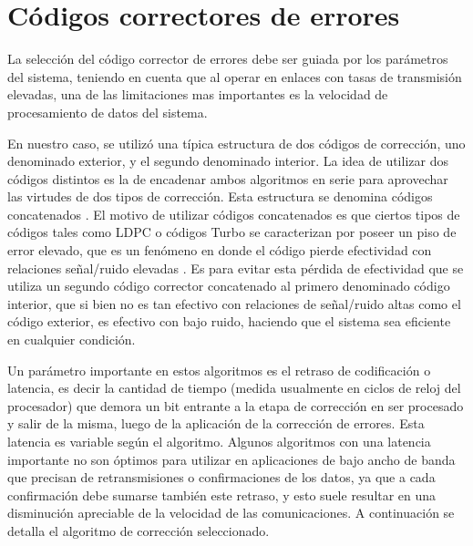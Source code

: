 \section{Códigos correctores de errores}

La selección del código corrector de errores debe ser guiada por los parámetros del sistema, teniendo en cuenta que al operar en enlaces con tasas de transmisión elevadas, una de las limitaciones mas importantes es la velocidad de procesamiento de datos del sistema.

En nuestro caso, se utilizó una típica estructura de dos códigos de corrección, uno denominado exterior, y el segundo denominado interior.
La idea de utilizar dos códigos distintos es la de encadenar ambos algoritmos en serie para aprovechar las virtudes de dos tipos de corrección. Esta estructura se denomina códigos concatenados \cite{forney1966concatenated}. El motivo de utilizar códigos concatenados es que ciertos tipos de códigos tales como LDPC o códigos Turbo se caracterizan por poseer un piso de error elevado, que es un fenómeno en donde el código pierde efectividad con relaciones señal/ruido elevadas \cite{richardson2003error}. Es para evitar esta pérdida de efectividad que se utiliza un segundo código corrector concatenado al primero denominado código interior, que si bien no es tan efectivo con relaciones de señal/ruido altas como el código exterior, es efectivo con bajo ruido, haciendo que el sistema sea eficiente en cualquier condición.

Un parámetro importante en estos algoritmos es el retraso de codificación o latencia, es decir la cantidad de tiempo (medida usualmente en ciclos de reloj del procesador) que demora un bit entrante a la etapa de corrección en ser procesado y salir de la misma, luego de la aplicación de la corrección de errores. Esta latencia es variable según el algoritmo. Algunos algoritmos con una latencia importante no son óptimos para utilizar en aplicaciones de bajo ancho de banda que precisan de retransmisiones o confirmaciones de los datos, ya que a cada confirmación debe sumarse también este retraso, y esto suele resultar en una disminución apreciable de la velocidad de las comunicaciones. A continuación se detalla el algoritmo de corrección seleccionado.

